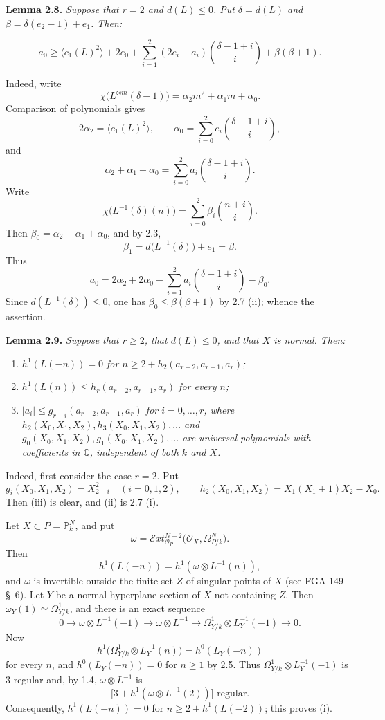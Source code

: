 \textbf{Lemma 2.8.} \emph{Suppose that \(r=2\) and \(d(L)\le0\). Put
\(\delta=d(L)\) and \(\beta=\delta(e_2-1)+e_1\). Then:}

\[
a_0\ge
\bigl\langle c_1(L)^2\bigr\rangle+2e_0
+\sum_{i=1}^{2}(2e_i-a_i)\binom{\delta-1+i}{i}
+\beta(\beta+1).
\]

Indeed, write
\[
\chi\bigl(L^{\otimes m}(\delta-1)\bigr)
=\alpha_2m^2+\alpha_1m+\alpha_0.
\]
Comparison of polynomials gives
\[
2\alpha_2=\bigl\langle c_1(L)^2\bigr\rangle,
\qquad
\alpha_0=\sum_{i=0}^{2}e_i\binom{\delta-1+i}{i},
\]
and
\[
\alpha_2+\alpha_1+\alpha_0
=\sum_{i=0}^{2}a_i\binom{\delta-1+i}{i}.
\]
Write
\[
\chi\bigl(L^{-1}(\delta)(n)\bigr)
=\sum_{i=0}^{2}\beta_i\binom{n+i}{i}.
\]
Then \(\beta_0=\alpha_2-\alpha_1+\alpha_0\), and by 2.3,
\[
\beta_1=d\bigl(L^{-1}(\delta)\bigr)+e_1=\beta.
\]
Thus
\[
a_0=2\alpha_2+2\alpha_0
-\sum_{i=1}^{2}a_i\binom{\delta-1+i}{i}-\beta_0.
\]
Since \(d(L^{-1}(\delta))\le0\), one has
\(\beta_0\le\beta(\beta+1)\) by 2.7 (ii); whence the assertion.

\textbf{Lemma 2.9.} \emph{Suppose that \(r\ge2\), that \(d(L)\le0\),
and that \(X\) is normal. Then:}
\begin{enumerate}[label=(\roman*)]
\item \emph{\(h^1(L(-n))=0\) for
\(n\ge2+h_2(a_{r-2},a_{r-1},a_r)\);}
\item \emph{\(h^1(L(n))\le h_r(a_{r-2},a_{r-1},a_r)\) for every
\(n\);}
\item \emph{\(|a_i|\le g_{r-i}(a_{r-2},a_{r-1},a_r)\) for
\(i=0,\ldots,r\), where
\(h_2(X_0,X_1,X_2),h_3(X_0,X_1,X_2),\ldots\) and
\(g_0(X_0,X_1,X_2),g_1(X_0,X_1,X_2),\ldots\) are universal
polynomials with coefficients in \(\mathbb Q\), independent of both
\(k\) and \(X\).}
\end{enumerate}

Indeed, first consider the case \(r=2\). Put
\[
g_i(X_0,X_1,X_2)=X_{2-i}^2\quad(i=0,1,2),
\qquad
h_2(X_0,X_1,X_2)=X_1(X_1+1)X_2-X_0.
\]
Then (iii) is clear, and (ii) is 2.7 (i).

Let \(X\subset P=\mathbb P_k^N\), and put
\[
\omega=
\mathcal E\!xt_{\mathcal O_P}^{N-2}
\bigl(\mathcal O_X,\Omega^N_{P/k}\bigr).
\]
Then
\[
h^1(L(-n))=h^1(\omega\otimes L^{-1}(n)),
\]
and \(\omega\) is invertible outside the finite set \(Z\) of singular
points of \(X\) (see FGA 149 \S~6). Let \(Y\) be a normal hyperplane
section of \(X\) not containing \(Z\). Then
\(\omega_Y(1)\simeq\Omega^1_{Y/k}\), and there is an exact sequence
\[
0\longrightarrow\omega\otimes L^{-1}(-1)
\longrightarrow\omega\otimes L^{-1}
\longrightarrow\Omega^1_{Y/k}\otimes L_Y^{-1}(-1)
\longrightarrow0.
\]
Now
\[
h^1\bigl(\Omega^1_{Y/k}\otimes L_Y^{-1}(n)\bigr)
=h^0(L_Y(-n))
\]
for every \(n\), and \(h^0(L_Y(-n))=0\) for \(n\ge1\) by 2.5. Thus
\(\Omega^1_{Y/k}\otimes L_Y^{-1}(-1)\) is 3-regular and, by 1.4,
\(\omega\otimes L^{-1}\) is
\[
\bigl[3+h^1(\omega\otimes L^{-1}(2))\bigr]\text{-regular}.
\]
Consequently, \(h^1(L(-n))=0\) for
\(n\ge2+h^1(L(-2))\); this proves (i).

